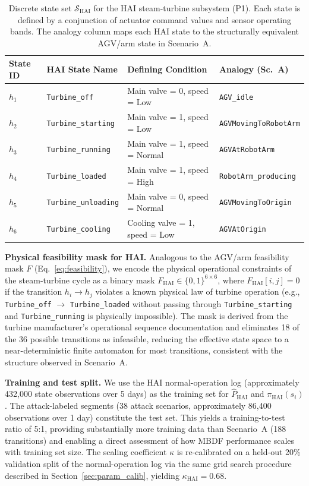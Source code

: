 \documentclass[manuscript,screen,review]{acmart}
\begin{document}
\begin{table}[!t]
\renewcommand{\arraystretch}{1.3}
\caption{Discrete state set $\mathcal{S}_{\mathrm{HAI}}$
for the HAI steam-turbine subsystem (P1). Each state is
defined by a conjunction of actuator command values and
sensor operating bands. The analogy column maps each HAI
state to the structurally equivalent AGV/arm state in
Scenario~A.}
\label{tab:hai_states}
\centering
\small
\begin{tabular}{llll}
\toprule
\textbf{State ID} & \textbf{HAI State Name} &
\textbf{Defining Condition} &
\textbf{Analogy (Sc.~A)} \\
\midrule
$h_1$ & \texttt{Turbine\_off}
      & Main valve = 0, speed = Low
      & \texttt{AGV\_idle} \\
$h_2$ & \texttt{Turbine\_starting}
      & Main valve = 1, speed = Low
      & \texttt{AGVMovingToRobotArm} \\
$h_3$ & \texttt{Turbine\_running}
      & Main valve = 1, speed = Normal
      & \texttt{AGVAtRobotArm} \\
$h_4$ & \texttt{Turbine\_loaded}
      & Main valve = 1, speed = High
      & \texttt{RobotArm\_producing} \\
$h_5$ & \texttt{Turbine\_unloading}
      & Main valve = 0, speed = Normal
      & \texttt{AGVMovingToOrigin} \\
$h_6$ & \texttt{Turbine\_cooling}
      & Cooling valve = 1, speed = Low
      & \texttt{AGVAtOrigin} \\
\bottomrule
\end{tabular}
\end{table}

\textbf{Physical feasibility mask for HAI.}
Analogous to the AGV/arm feasibility mask $F$
(Eq.~\eqref{eq:feasibility}), we encode the physical
operational constraints of the steam-turbine cycle as a
binary mask $F_{\mathrm{HAI}} \in \{0,1\}^{6\times 6}$,
where $F_{\mathrm{HAI}}[i,j] = 0$ if the transition
$h_i \to h_j$ violates a known physical law of turbine
operation (e.g., \texttt{Turbine\_off} $\to$
\texttt{Turbine\_loaded} without passing through
\texttt{Turbine\_starting} and \texttt{Turbine\_running}
is physically impossible). The mask is derived from the
turbine manufacturer's operational sequence documentation
and eliminates 18 of the 36 possible transitions as
infeasible, reducing the effective state space to a
near-deterministic finite automaton for most transitions,
consistent with the structure observed in Scenario~A.

\textbf{Training and test split.}
We use the HAI normal-operation log (approximately
432{,}000 state observations over 5 days) as the
training set for $\hat{P}_{\mathrm{HAI}}$ and
$\pi_{\mathrm{HAI}}(s_i)$. The attack-labeled segments
(38 attack scenarios, approximately 86{,}400 observations
over 1 day) constitute the test set. This yields a
training-to-test ratio of 5:1, providing substantially
more training data than Scenario~A (188 transitions)
and enabling a direct assessment of how MBDF performance
scales with training set size. The scaling coefficient
$\kappa$ is re-calibrated on a held-out 20\% validation
split of the normal-operation log via the same grid
search procedure described in Section~\ref{sec:param_calib},
yielding $\kappa_{\mathrm{HAI}} = 0.68$.
\end{document}
